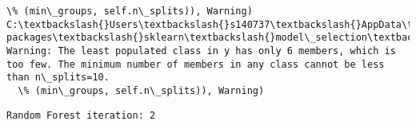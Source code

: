 \documentclass[11pt]{article}
\begin{document}
\begin{Verbatim}[commandchars=\\\{\}]
  \% (min\_groups, self.n\_splits)), Warning)
C:\textbackslash{}Users\textbackslash{}s140737\textbackslash{}AppData\textbackslash{}Local\textbackslash{}Continuum\textbackslash{}anaconda3\textbackslash{}lib\textbackslash{}site-packages\textbackslash{}sklearn\textbackslash{}model\_selection\textbackslash{}\_split.py:605: Warning: The least populated class in y has only 6 members, which is too few. The minimum number of members in any class cannot be less than n\_splits=10.
  \% (min\_groups, self.n\_splits)), Warning)

    \end{Verbatim}

    \begin{Verbatim}[commandchars=\\\{\}]
Random Forest iteration: 2 

    \end{Verbatim}
\end{document}

